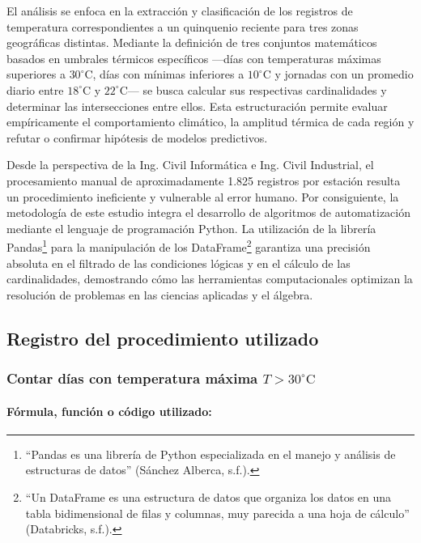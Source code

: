 \documentclass[12pt]{article}
\begin{document}
El análisis se enfoca en la extracción y clasificación de los registros de temperatura correspondientes a un quinquenio reciente para tres zonas geográficas distintas. Mediante la definición de tres conjuntos matemáticos basados en umbrales térmicos específicos —días con temperaturas máximas superiores a $30^{\circ}\text{C}$, días con mínimas inferiores a $10^{\circ}\text{C}$ y jornadas con un promedio diario entre $18^{\circ}\text{C}$ y $22^{\circ}\text{C}$— se busca calcular sus respectivas cardinalidades y determinar las intersecciones entre ellos. Esta estructuración permite evaluar empíricamente el comportamiento climático, la amplitud térmica de cada región y refutar o confirmar hipótesis de modelos predictivos.

Desde la perspectiva de la Ing. Civil Informática e Ing. Civil Industrial, el procesamiento manual de aproximadamente 1.825 registros por estación resulta un procedimiento ineficiente y vulnerable al error humano. Por consiguiente, la metodología de este estudio integra el desarrollo de algoritmos de automatización mediante el lenguaje de programación Python. La utilización de la librería Pandas\footnote{``Pandas es una librería de Python especializada en el manejo y análisis de estructuras de datos'' (Sánchez Alberca, s.f.).} para la manipulación de los DataFrame\footnote{``Un DataFrame es una estructura de datos que organiza los datos en una tabla bidimensional de filas y columnas, muy parecida a una hoja de cálculo'' (Databricks, s.f.).} garantiza una precisión absoluta en el filtrado de las condiciones lógicas y en el cálculo de las cardinalidades, demostrando cómo las herramientas computacionales optimizan la resolución de problemas en las ciencias aplicadas y el álgebra.

\newpage

\subsection{Registro del procedimiento utilizado}

\subsubsection{Contar días con temperatura máxima $T > 30^\circ \text{C}$}

\paragraph{Fórmula, función o código utilizado:} %
\end{document}
